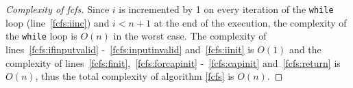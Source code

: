 \begin{proof}[Complexity of fcfs]
   Since $i$ is incremented by 1 on every iteration of the \texttt{while} loop (line~\ref{fcfs:iinc}) and $i < n+1$ at the
   end of the execution, the complexity of the \texttt{while} loop is $O\left(n\right)$ in the worst case. The complexity of
   lines~\ref{fcfs:ifinputvalid} -~\ref{fcfs:inputinvalid} and~\ref{fcfs:iinit} is $O\left(1\right)$ and the complexity of
   lines~\ref{fcfs:finit},~\ref{fcfs:forcapinit} -~\ref{fcfs:capinit} and~\ref{fcfs:return} is $O\left(n\right)$, thus the
   total complexity of algorithm \ref{fcfs} is $O\left(n\right)$.
\end{proof}
